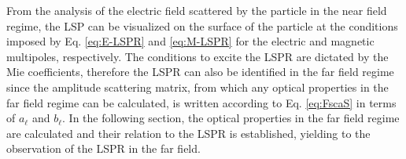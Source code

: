 From the analysis of the electric field scattered by the particle in the near field regime, the LSP can be visualized on the surface of the particle at the conditions imposed by Eq. \eqref{eq:E-LSPR} and \eqref{eq:M-LSPR} for the electric and magnetic multipoles, respectively. The conditions to excite the LSPR are dictated by the Mie coefficients, therefore the LSPR can also be identified in the far field regime since the amplitude scattering matrix, from which  any optical properties in the far field regime can be calculated, is written according to Eq. \eqref{eq:FscaS} in terms of $a_\ell$ and $b_\ell$. In the following section, the optical properties in the far field regime are calculated and their relation to the LSPR is established, yielding to the observation of the LSPR in the far field.
